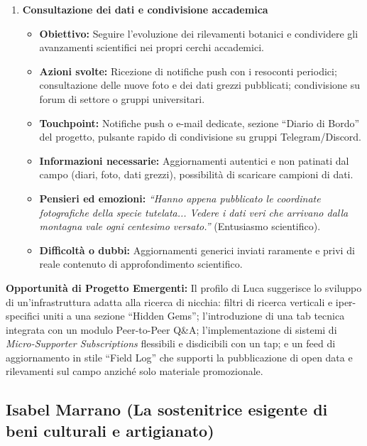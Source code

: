 \documentclass[11pt,a4paper]{article}
\begin{document}
\begin{enumerate}
        \item \textbf{Consultazione dei dati e condivisione accademica}
        \begin{itemize}
            \item \textbf{Obiettivo:} Seguire l'evoluzione dei rilevamenti botanici e condividere gli avanzamenti scientifici nei propri cerchi accademici.
            \item \textbf{Azioni svolte:} Ricezione di notifiche push con i resoconti periodici; consultazione delle nuove foto e dei dati grezzi pubblicati; condivisione su forum di settore o gruppi universitari.
            \item \textbf{Touchpoint:} Notifiche push o e-mail dedicate, sezione ``Diario di Bordo'' del progetto, pulsante rapido di condivisione su gruppi Telegram/Discord.
            \item \textbf{Informazioni necessarie:} Aggiornamenti autentici e non patinati dal campo (diari, foto, dati grezzi), possibilità di scaricare campioni di dati.
            \item \textbf{Pensieri ed emozioni:} \textit{``Hanno appena pubblicato le coordinate fotografiche della specie tutelata... Vedere i dati veri che arrivano dalla montagna vale ogni centesimo versato.''} (Entusiasmo scientifico).
            \item \textbf{Difficoltà o dubbi:} Aggiornamenti generici inviati raramente e privi di reale contenuto di approfondimento scientifico.
        \end{itemize}

    \end{enumerate}

    \vspace{0.3cm}
    \noindent\textbf{Opportunità di Progetto Emergenti:} Il profilo di Luca suggerisce lo sviluppo di un'infrastruttura adatta alla ricerca di nicchia: filtri di ricerca verticali e iper-specifici uniti a una sezione ``Hidden Gems''; l'introduzione di una tab tecnica integrata con un modulo Peer-to-Peer Q\&A; l'implementazione di sistemi di \textit{Micro-Supporter Subscriptions} flessibili e disdicibili con un tap; e un feed di aggiornamento in stile ``Field Log'' che supporti la pubblicazione di open data e rilevamenti sul campo anziché solo materiale promozionale.


    \subsection{Isabel Marrano (La sostenitrice esigente di beni culturali e artigianato)}
    \label{subsec:uj5}
\end{document}
